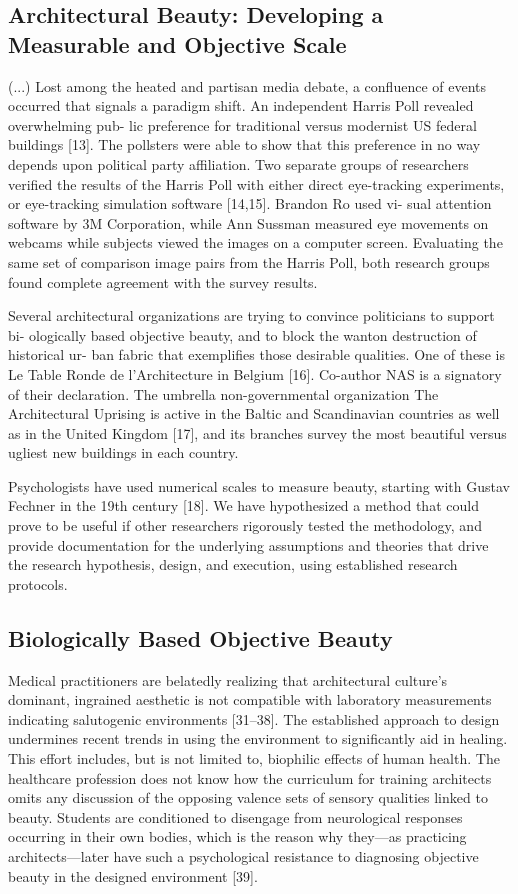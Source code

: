 \documentclass[a4paper]{article}
\begin{document}
\subsection{Architectural Beauty: Developing a Measurable and
Objective Scale}

(...) Lost among the heated and partisan media debate, a confluence of events occurred
that signals a paradigm shift. An independent Harris Poll revealed overwhelming pub-
lic preference for traditional versus modernist US federal buildings [13]. The pollsters
were able to show that this preference in no way depends upon political party affiliation.
Two separate groups of researchers verified the results of the Harris Poll with either direct
eye-tracking experiments, or eye-tracking simulation software [14,15]. Brandon Ro used vi-
sual attention software by 3M Corporation, while Ann Sussman measured eye movements
on webcams while subjects viewed the images on a computer screen. Evaluating the same
set of comparison image pairs from the Harris Poll, both research groups found complete
agreement with the survey results.

Several architectural organizations are trying to convince politicians to support bi-
ologically based objective beauty, and to block the wanton destruction of historical ur-
ban fabric that exemplifies those desirable qualities. One of these is Le Table Ronde de
l’Architecture in Belgium [16]. Co-author NAS is a signatory of their declaration. The
umbrella non-governmental organization The Architectural Uprising is active in the Baltic
and Scandinavian countries as well as in the United Kingdom [17], and its branches survey
the most beautiful versus ugliest new buildings in each country.

Psychologists have used numerical scales to measure beauty, starting with Gustav
Fechner in the 19th century [18]. We have hypothesized a method that could prove to be
useful if other researchers rigorously tested the methodology, and provide documentation
for the underlying assumptions and theories that drive the research hypothesis, design,
and execution, using established research protocols.

\subsection{Biologically Based Objective Beauty}

Medical practitioners are belatedly realizing that architectural culture’s dominant,
ingrained aesthetic is not compatible with laboratory measurements indicating salutogenic
environments [31–38]. The established approach to design undermines recent trends in
using the environment to significantly aid in healing. This effort includes, but is not limited
to, biophilic effects of human health. The healthcare profession does not know how the
curriculum for training architects omits any discussion of the opposing valence sets of
sensory qualities linked to beauty. Students are conditioned to disengage from neurological
responses occurring in their own bodies, which is the reason why they—as practicing
architects—later have such a psychological resistance to diagnosing objective beauty in the
designed environment [39].
\end{document}
